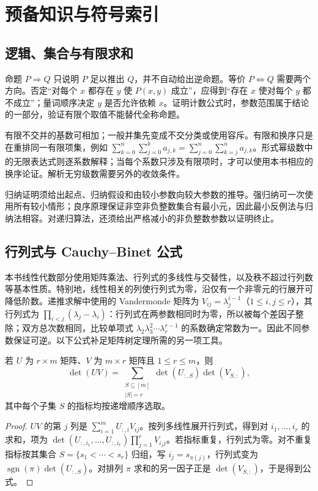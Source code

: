 \setcounter{chapter}{0} %
\chapter{预备知识与符号索引}
\label{app:prerequisites}

\section{逻辑、集合与有限求和}

命题 $P\Rightarrow Q$ 只说明 $P$ 足以推出 $Q$，并不自动给出逆命题。等价 $P\Leftrightarrow Q$ 需要两个方向。否定“对每个 $x$ 都存在 $y$ 使 $P(x,y)$ 成立”，应得到“存在 $x$ 使对每个 $y$ 都不成立”；量词顺序决定 $y$ 是否允许依赖 $x$。证明计数公式时，参数范围属于结论的一部分，验证有限个取值不能替代全称命题。

有限不交并的基数可相加；一般并集先变成不交分类或使用容斥。有限和换序只是在重排同一有限项集，例如 $\sum_{k=0}^n\sum_{j=0}^k a_{j,k}=\sum_{j=0}^n\sum_{k=j}^n a_{j,k}$。形式幂级数中的无限表达式则逐系数解释；当每个系数只涉及有限项时，才可以使用本书相应的换序论证。解析无穷级数需要另外的收敛条件。

归纳证明须给出起点、归纳假设和由较小参数向较大参数的推导。强归纳可一次使用所有较小情形；良序原理保证非空非负整数集合有最小元，因此最小反例法与归纳法相容。对递归算法，还须给出严格减小的非负整数参数以证明终止。

\section{行列式与 Cauchy--Binet 公式}

本书线性代数部分使用矩阵乘法、行列式的多线性与交替性，以及秩不超过行列数等基本性质。特别地，线性相关的列使行列式为零，沿仅有一个非零元的行展开可降低阶数。递推求解中使用的 Vandermonde 矩阵为 $V_{ij}=\lambda_j^{i-1}$（$1\le i,j\le r$），其行列式为 $\prod_{i<j}(\lambda_j-\lambda_i)$：行列式在两参数相同时为零，所以被每个差因子整除；双方总次数相同，比较单项式 $\lambda_2\lambda_3^2\cdots\lambda_r^{r-1}$ 的系数确定常数为一。因此不同参数保证可逆。以下公式补足矩阵树定理所需的另一项工具。

\begin{theorem}
若 $U$ 为 $r\times m$ 矩阵、$V$ 为 $m\times r$ 矩阵且 $1\le r\le m$，则
\[
 \det(UV)=\sum_{\substack{S\subseteq[m]\\|S|=r}}
             \det(U_{:,S})\det(V_{S,:}),
\]
其中每个子集 $S$ 的指标均按递增顺序选取。
\end{theorem}
\begin{proof}
$UV$ 的第 $j$ 列是 $\sum_{i=1}^m U_{:,i}V_{ij}$。按列多线性展开行列式，得到对 $i_1,\ldots,i_r$ 的求和，项为 $\det(U_{:,i_1},\ldots,U_{:,i_r})\prod_{j=1}^r V_{i_jj}$。若指标重复，行列式为零。对不重复指标按其集合 $S=\{s_1<\cdots<s_r\}$ 归组，写 $i_j=s_{\pi(j)}$，行列式变为 $\operatorname{sgn}(\pi)\det(U_{:,S})$。对排列 $\pi$ 求和的另一因子正是 $\det(V_{S,:})$，于是得到公式。
\end{proof}

